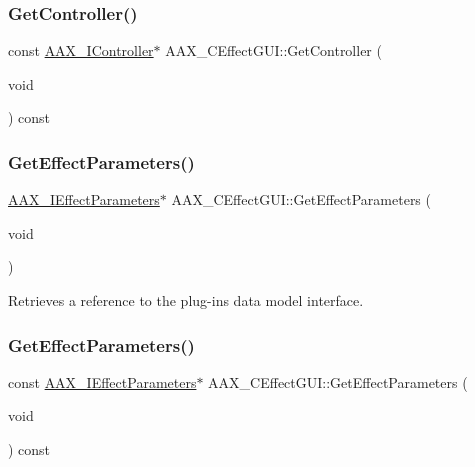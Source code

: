 \mbox{\label{a01477_af7c40eadba208ff6d14f70579250217d}} 
\subsubsection{\texorpdfstring{GetController()}{GetController()}\hspace{0.1cm}{\footnotesize\ttfamily [2/2]}}
{\footnotesize\ttfamily const \mbox{\hyperlink{a01789}{A\+A\+X\+\_\+\+I\+Controller}}$\ast$ A\+A\+X\+\_\+\+C\+Effect\+G\+U\+I\+::\+Get\+Controller (\begin{DoxyParamCaption}\item[{void}]{ }\end{DoxyParamCaption}) const}

\mbox{\label{a01477_a4036630ef94feeec9f0988086a74f992}} 
\subsubsection{\texorpdfstring{GetEffectParameters()}{GetEffectParameters()}\hspace{0.1cm}{\footnotesize\ttfamily [1/2]}}
{\footnotesize\ttfamily \mbox{\hyperlink{a01825}{A\+A\+X\+\_\+\+I\+Effect\+Parameters}}$\ast$ A\+A\+X\+\_\+\+C\+Effect\+G\+U\+I\+::\+Get\+Effect\+Parameters (\begin{DoxyParamCaption}\item[{void}]{ }\end{DoxyParamCaption})}



Retrieves a reference to the plug-\/in\textquotesingle{}s data model interface. 

\mbox{\label{a01477_af5f9405e5ef41d6de24d70f7ee77a325}} 
\subsubsection{\texorpdfstring{GetEffectParameters()}{GetEffectParameters()}\hspace{0.1cm}{\footnotesize\ttfamily [2/2]}}
{\footnotesize\ttfamily const \mbox{\hyperlink{a01825}{A\+A\+X\+\_\+\+I\+Effect\+Parameters}}$\ast$ A\+A\+X\+\_\+\+C\+Effect\+G\+U\+I\+::\+Get\+Effect\+Parameters (\begin{DoxyParamCaption}\item[{void}]{ }\end{DoxyParamCaption}) const}

